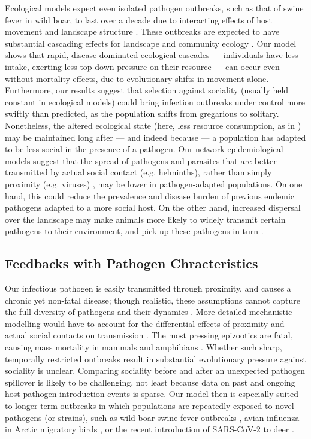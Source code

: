 Ecological models expect even isolated pathogen outbreaks, such as that of swine fever in wild boar, to last over a decade due to interacting effects of host movement and landscape structure \citep{scherer2020}.
These outbreaks are expected to have substantial cascading effects for landscape and community ecology \citep{monk2022}.
Our model shows that rapid, disease-dominated ecological cascades --- individuals have less intake, exerting less top-down pressure on their resource --- can occur even without mortality effects, due to evolutionary shifts in movement alone.
Furthermore, our results suggest that selection against sociality (usually held constant in ecological models) could bring infection outbreaks under control more swiftly than predicted, as the population shifts from gregarious to solitary.
Nonetheless, the altered ecological state (here, less resource consumption, as in \citealt{monk2022}) may be maintained long after --- and indeed because --- a population has adapted to be less social in the presence of a pathogen.
Our network epidemiological models suggest that the spread of pathogens and parasites that are better transmitted by actual social contact (e.g. helminths), rather than simply proximity (e.g. viruses) \citep{rimbach2015}, may be lower in pathogen-adapted populations.
On one hand, this could reduce the prevalence and disease burden of previous endemic pathogens adapted to a more social host.
On the other hand, increased dispersal over the landscape may make animals more likely to widely transmit certain pathogens to their environment, and pick up these pathogens in turn \citep[][]{rimbach2015,weinstein2018,scherer2020}.

\subsection*{Feedbacks with Pathogen Chracteristics}

Our infectious pathogen is easily transmitted through proximity, and causes a chronic yet non-fatal disease; though realistic, these assumptions cannot capture the full diversity of pathogens and their dynamics \citep{white2018,scherer2020, lunn2021}.
More detailed mechanistic modelling would have to account for the differential effects of proximity and actual social contacts on transmission \citep{rimbach2015}.
The most pressing epizootics are fatal, causing mass mortality in mammals \citep{blehert2009, fereidouni2019,fey2015} and amphibians \citep{scheele2019,sanderson2020}.
Whether such sharp, temporally restricted outbreaks result in substantial evolutionary pressure against sociality is unclear.
Comparing sociality before and after an unexpected pathogen spillover \citep[as in][]{kuchipudi2022} is likely to be challenging, not least because data on past and ongoing host-pathogen introduction events is sparse.
Our model then is especially suited to longer-term outbreaks in which populations are repeatedly exposed to novel pathogens (or strains), such as wild boar swine fever outbreaks \citep{scherer2020}, avian influenza in Arctic migratory birds \citep{globconsorth5n82016}, or the recent introduction of SARS-CoV-2 to deer \citep{kuchipudi2022}.

